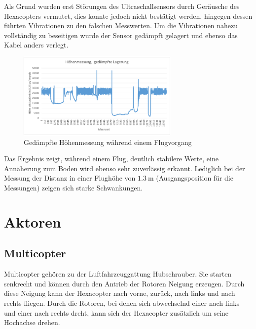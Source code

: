   Als Grund wurden erst Störungen des Ultraschallsensors durch Geräusche des Hexacopters vermutet, dies konnte jedoch nicht bestätigt werden, hingegen dessen führten Vibrationen
  zu den falschen Messwerten. Um die Vibrationen nahezu vollständig zu beseitigen wurde der Sensor gedämpft gelagert und ebenso das Kabel anders verlegt.
  \begin{figure}[H]
    \begin{centering}
      \includegraphics[width = 0.7\textwidth]{Bilder/Hoehenmessung_gedaempft}
    \par\end{centering}
    \caption{Gedämpfte Höhenmessung während einem Flugvorgang}
    \label{Hoehenmessung_gedaempft}
  \end{figure}
  Das Ergebnis zeigt, während einem Flug, deutlich stabilere Werte, eine Annäherung zum Boden wird ebenso sehr zuverlässig erkannt. Lediglich bei der Messung der Distanz in einer Flughöhe
  von \ca $\SI{1.3}{\meter}$ (Ausgangsposition für die Messungen) zeigen sich starke Schwankungen.

\chapter{Aktoren}
\renewcommand{\kapitelautor}{Autor: Christina Bornberg}

\section{Multicopter}
  Multicopter gehören zu der Luftfahrzeuggattung Hubschrauber. Sie starten senkrecht und können durch den Antrieb der Rotoren Neigung erzeugen. Durch diese Neigung kann der Hexacopter nach vorne, zurück, nach links und nach rechts fliegen. Durch die Rotoren, bei denen sich abwechselnd einer nach links und einer nach rechts dreht, kann sich der Hexacopter zusätzlich um seine Hochachse drehen.

